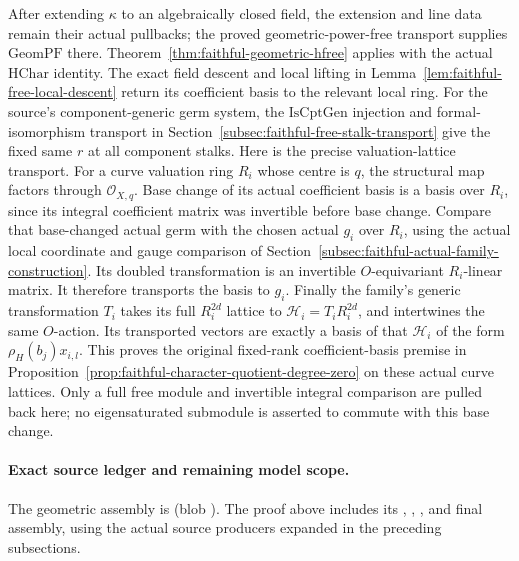 After extending \(\kappa\) to an algebraically closed field,
the extension and line data remain their actual pullbacks;
the proved geometric-power-free transport supplies
\(\mathrm{GeomPF}\) there.
Theorem~\ref{thm:faithful-geometric-hfree} applies with the
actual \(\mathrm{HChar}\) identity.
The exact field descent and local lifting in
Lemma~\ref{lem:faithful-free-local-descent} return its
coefficient basis to the relevant local ring.
For the source's component-generic germ system, the
\(\mathrm{IsCptGen}\) injection and formal-isomorphism
transport in
Section~\ref{subsec:faithful-free-stalk-transport}
give the fixed same \(r\) at all component stalks.
Here is the precise valuation-lattice transport.
For a curve valuation ring \(R_i\) whose centre is \(q\),
the structural map factors through \(\mathcal O_{X,q}\).
Base change of its actual coefficient basis is a basis
over \(R_i\), since its integral coefficient matrix was
invertible before base change.
Compare that base-changed actual germ with the chosen
actual \(g_i\) over \(R_i\), using the actual local
coordinate and gauge comparison of
Section~\ref{subsec:faithful-actual-family-construction}.
Its doubled transformation is an invertible
\(O\)-equivariant \(R_i\)-linear matrix.
It therefore transports the basis to \(g_i\).
Finally the family's generic transformation \(T_i\)
takes its full \(R_i^{2d}\) lattice to
\(\mathcal H_i=T_iR_i^{2d}\), and intertwines the
same \(O\)-action.  Its transported vectors are exactly
a basis of that \(\mathcal H_i\) of the form
\(\rho_H(b_j)x_{i,l}\).
This proves the original fixed-rank coefficient-basis
premise in
Proposition~\ref{prop:faithful-character-quotient-degree-zero}
on these actual curve lattices.
Only a full free module and invertible integral comparison
are pulled back here; no eigensaturated submodule is
asserted to commute with this base change.

\paragraph{Exact source ledger and remaining model scope.}
The geometric assembly is
\href{https://github.com/ChristianKudeba/alpoge-rh-verification/blob/alpoge-source-7cbf7a0c/src/Development/AutomorphicSpectrum/Proofs/GeometryProofs/HeightCharFreeGeometric.lean}
{}
(blob ).
The proof above includes its ,
, , and final assembly,
using the actual source producers expanded in the preceding
subsections.


